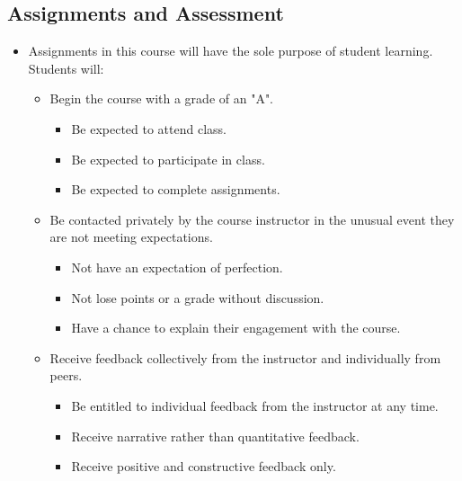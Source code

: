 \documentclass[11pt]{article}
\begin{document}

\subsection*{Assignments and Assessment}

\begin{itemize}
    \item Assignments in this course will have the sole purpose of student learning. Students will:
        \begin{itemize}
            \item  Begin the course with a grade of an "A".
            \begin{itemize}
                \item  Be expected to attend class.
                \item  Be expected to participate in class.
                \item  Be expected to complete assignments.
            \end{itemize}
            \item  Be contacted privately by the course instructor in the unusual event they are not meeting expectations.
            \begin{itemize}
                \item  Not have an expectation of perfection.
                \item  Not lose points or a grade without discussion.
                \item  Have a chance to explain their engagement with the course.
            \end{itemize}
            \item  Receive feedback collectively from the instructor and individually from peers.
            \begin{itemize}
                \item  Be entitled to individual feedback from the instructor at any time.
                \item  Receive narrative rather than quantitative feedback.
                \item  Receive positive and constructive feedback only.
            \end{itemize}
        \end{itemize}
\end{itemize}

\end{document}
